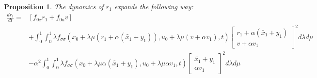 \documentclass[a4paper,10pt]{article}
\newtheorem{proposition}{Proposition}
\begin{document}
\begin{proposition}
    The dynamics of $r_{1}$ expands the following way:
    \begin{equation}
	\label{r1dynamicsexp}
	\begin{split}
        \frac{dr_{1}}{dt}  = & [f_{0x}r_{1} + f_{0u}v]
         \\
	& + \int_{0}^{1} \int_{0}^{1}
	\lambda f_{\sigma \sigma}(x_{0} + \lambda \mu (r_{1} + \alpha(\tilde{x_{1}}+y_{1})),
	u_{0} + \lambda \mu (v + \alpha v_{1}),t)
	\left[\begin{array}
	{c}
	    r_{1} + \alpha(\tilde{x_{1}}+y_{1})  \\
	     v + \alpha v_{1}
	\end{array}\right]^{2} d \lambda d \mu
	 \\
	&- \alpha^{2} \int_{0}^{1} \int_{0}^{1}
	\lambda f_{\sigma \sigma}(x_{0} + \lambda \mu\alpha(\tilde{x_{1}}+y_{1}),
	u_{0} + \lambda \mu \alpha v_{1},t)
	\left[\begin{array}
	{c}
	   \tilde{x_{1}}+y_{1}  \\
	     \alpha v_{1}
	\end{array}\right]^{2} d \lambda d \mu
	\end{split}
    \end{equation}
\end{proposition}
\end{document}
